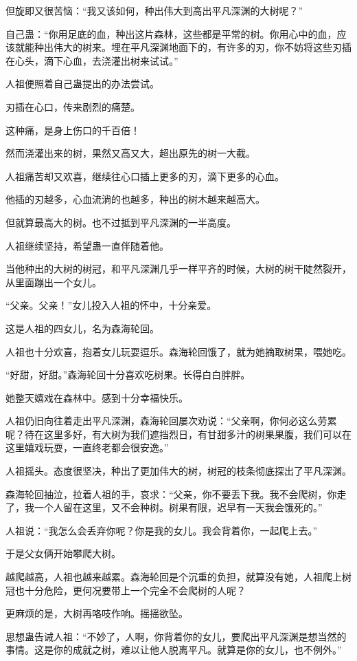\begin{this_body}
但旋即又很苦恼：“我又该如何，种出伟大到高出平凡深渊的大树呢？”

自己蛊：“你用足底的血，种出这片森林，这些都是平常的树。你用心中的血，应该就能种出伟大的树来。埋在平凡深渊地面下的，有许多的刃，你不妨将这些刃插在心头，滴下心血，去浇灌出树来试试。”

人祖便照着自己蛊提出的办法尝试。

刃插在心口，传来剧烈的痛楚。

这种痛，是身上伤口的千百倍！

然而浇灌出来的树，果然又高又大，超出原先的树一大截。

人祖痛苦却又欢喜，继续往心口插上更多的刃，滴下更多的心血。

他插的刃越多，心血流淌的也越多，种出的树木越来越高大。

但就算最高大的树。也不过抵到平凡深渊的一半高度。

人祖继续坚持，希望蛊一直伴随着他。

当他种出的大树的树冠，和平凡深渊几乎一样平齐的时候，大树的树干陡然裂开，从里面蹦出一个女儿。

“父亲。父亲！”女儿投入人祖的怀中，十分亲爱。

这是人祖的四女儿，名为森海轮回。

人祖也十分欢喜，抱着女儿玩耍逗乐。森海轮回饿了，就为她摘取树果，喂她吃。

“好甜，好甜。”森海轮回十分喜欢吃树果。长得白白胖胖。

她整天嬉戏在森林中。感到十分幸福快乐。

人祖仍旧向往着走出平凡深渊，森海轮回屡次劝说：“父亲啊，你何必这么劳累呢？待在这里多好，有大树为我们遮挡烈日，有甘甜多汁的树果果腹，我们可以在这里嬉戏玩耍，一直终老都会很安逸。”

人祖摇头。态度很坚决，种出了更加伟大的树，树冠的枝条彻底探出了平凡深渊。

森海轮回抽泣，拉着人祖的手，哀求：“父亲，你不要丢下我。我不会爬树，你走了，我一个人留在这里，又不会种树。树果有限，迟早有一天我会饿死的。”

人祖说：“我怎么会丢弃你呢？你是我的女儿。我会背着你，一起爬上去。”

于是父女俩开始攀爬大树。

越爬越高，人祖也越来越累。森海轮回是个沉重的负担，就算没有她，人祖爬上树冠也十分危险，更何况要带上一个完全不会爬树的人呢？

更麻烦的是，大树再咯吱作响。摇摇欲坠。

思想蛊告诫人祖：“不妙了，人啊，你背着你的女儿，要爬出平凡深渊是想当然的事情。这是你的成就之树，难以让他人脱离平凡。就算是你的女儿，也不例外。”


\end{this_body}
